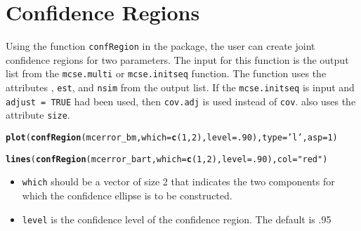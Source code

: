 \documentclass[11pt]{article}\usepackage[]{graphicx}\usepackage[]{color}
\makeatletter
\newcommand{\hlnum}[1]{\textcolor[rgb]{0.686,0.059,0.569}{#1}}%
\newcommand{\hlstr}[1]{\textcolor[rgb]{0.192,0.494,0.8}{#1}}%
\newcommand{\hlstd}[1]{\textcolor[rgb]{0.345,0.345,0.345}{#1}}%
\newcommand{\hlkwc}[1]{\textcolor[rgb]{0.333,0.667,0.333}{#1}}%
\newcommand{\hlkwd}[1]{\textcolor[rgb]{0.737,0.353,0.396}{\textbf{#1}}}%
\newenvironment{kframe}{%
 \def\at@end@of@kframe{}%
 \ifinner\ifhmode%
  \def\at@end@of@kframe{\end{minipage}}%
  \begin{minipage}{\columnwidth}%
 \fi\fi%
 \def\FrameCommand##1{\hskip\@totalleftmargin \hskip-\fboxsep
 \colorbox{shadecolor}{##1}\hskip-\fboxsep
     \hskip-\linewidth \hskip-\@totalleftmargin \hskip\columnwidth}%
 \MakeFramed {\advance\hsize-\width
   \@totalleftmargin\z@ \linewidth\hsize
   \@setminipage}}%
 {\par\unskip\endMakeFramed%
 \at@end@of@kframe}
\newenvironment{knitrout}{}{} %
\makeatother
\begin{document}
\bigskip
\section{Confidence Regions}

Using the function \texttt{confRegion} in the package, the user can create joint confidence regions for two parameters. The input for this function is the output list from the \texttt{mcse.multi} or \texttt{mcse.initseq} function. The function uses the attributes , \texttt{est}, and \texttt{nsim} from the output list. If the \texttt{mcse.initseq} is input and \texttt{adjust = TRUE} had been used, then \texttt{cov.adj} is used instead of \texttt{cov}.  also uses the attribute \texttt{size}.

\begin{knitrout}
\color{fgcolor}\begin{kframe}
\begin{alltt}
\hlkwd{plot}\hlstd{(}\hlkwd{confRegion}\hlstd{(mcerror_bm,} \hlkwc{which} \hlstd{=} \hlkwd{c}\hlstd{(}\hlnum{1}\hlstd{,}\hlnum{2}\hlstd{),} \hlkwc{level} \hlstd{=} \hlnum{.90}\hlstd{),} \hlkwc{type} \hlstd{=} \hlstr{'l'}\hlstd{,} \hlkwc{asp} \hlstd{=} \hlnum{1}\hlstd{)}
\end{alltt}


{\ttfamily\noindent\bfseries\color{errorcolor}{\#\# Error in confRegion(mcerror\_bm, which = c(1, 2), level = 0.9): object 'mcerror\_bm' not found}}\begin{alltt}
\hlkwd{lines}\hlstd{(}\hlkwd{confRegion}\hlstd{(mcerror_bart,} \hlkwc{which} \hlstd{=} \hlkwd{c}\hlstd{(}\hlnum{1}\hlstd{,}\hlnum{2}\hlstd{),} \hlkwc{level} \hlstd{=} \hlnum{.90}\hlstd{),} \hlkwc{col} \hlstd{=} \hlstr{"red"}\hlstd{)}
\end{alltt}


{\ttfamily\noindent\bfseries\color{errorcolor}{\#\# Error in confRegion(mcerror\_bart, which = c(1, 2), level = 0.9): object 'mcerror\_bart' not found}}\end{kframe}
\end{knitrout}

\begin{itemize}
\item \texttt{which} should be a vector of size 2 that indicates the two components for which the confidence ellipse is to be constructed.

\item \texttt{level} is the confidence level of the confidence region. The default is .95
\end{itemize}
\end{document}

